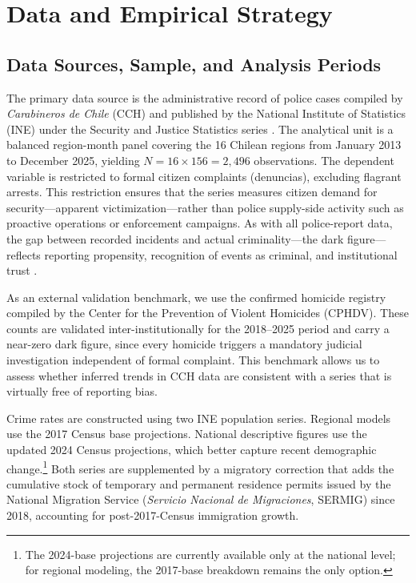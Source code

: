 \documentclass[pdflatex,sn-basic]{sn-jnl}
\begin{document}
\section{Data and Empirical Strategy}
\label{sec:datos}

\subsection{Data Sources, Sample, and Analysis Periods}

The primary data source is the administrative record of police cases compiled by \textit{Carabineros de Chile} (CCH) and published by the National Institute of Statistics (INE) under the Security and Justice Statistics series \citep{INE2026}. The analytical unit is a balanced region-month panel covering the 16 Chilean regions from January 2013 to December 2025, yielding $N = 16 \times 156 = 2{,}496$ observations. The dependent variable is restricted to formal citizen complaints (denuncias), excluding flagrant arrests. This restriction ensures that the series measures citizen demand for security---apparent victimization---rather than police supply-side activity such as proactive operations or enforcement campaigns. As with all police-report data, the gap between recorded incidents and actual criminality---the dark figure---reflects reporting propensity, recognition of events as criminal, and institutional trust \citep{gamarra2024a}.

As an external validation benchmark, we use the confirmed homicide registry compiled by the Center for the Prevention of Violent Homicides (CPHDV). These counts are validated inter-institutionally for the 2018--2025 period and carry a near-zero dark figure, since every homicide triggers a mandatory judicial investigation independent of formal complaint. This benchmark allows us to assess whether inferred trends in CCH data are consistent with a series that is virtually free of reporting bias.

Crime rates are constructed using two INE population series. Regional models use the 2017 Census base projections. National descriptive figures use the updated 2024 Census projections, which better capture recent demographic change.\footnote{The 2024-base projections are currently available only at the national level; for regional modeling, the 2017-base breakdown remains the only option.} Both series are supplemented by a migratory correction that adds the cumulative stock of temporary and permanent residence permits issued by the National Migration Service (\textit{Servicio Nacional de Migraciones}, SERMIG) since 2018, accounting for post-2017-Census immigration growth.
\end{document}
